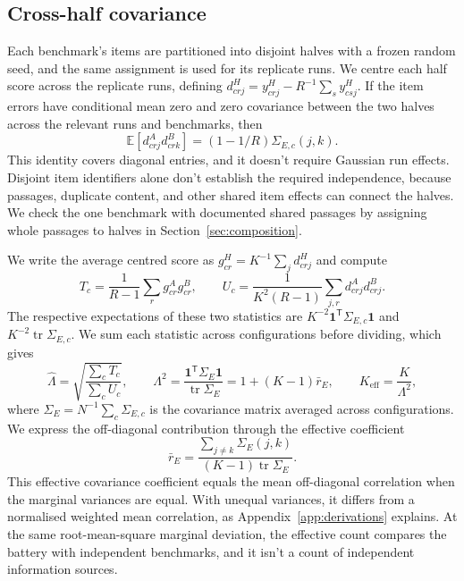 \documentclass{article}
\newcommand{\Lam}{\Lambda}
\newcommand{\Sig}{\Sigma_E}
\begin{document}
\subsection{Cross-half covariance}
Each benchmark's items are partitioned into disjoint halves with a frozen random seed, and the same assignment is used for its replicate runs. We centre each half score across the replicate runs, defining $d^H_{crj}=y^H_{crj}-R^{-1}\sum_s y^H_{csj}$. If the item errors have conditional mean zero and zero covariance between the two halves across the relevant runs and benchmarks, then
\begin{equation}
\mathbb{E}[d^A_{crj}d^B_{crk}]=(1-1/R)\Sigma_{E,c}(j,k).
\label{eq:identity}
\end{equation}
This identity covers diagonal entries, and it doesn't require Gaussian run effects. Disjoint item identifiers alone don't establish the required independence, because passages, duplicate content, and other shared item effects can connect the halves. We check the one benchmark with documented shared passages by assigning whole passages to halves in Section~\ref{sec:composition}.

We write the average centred score as $g^H_{cr}=K^{-1}\sum_j d^H_{crj}$ and compute
\begin{equation}
T_c=\frac{1}{R-1}\sum_r g^A_{cr}g^B_{cr},\qquad
U_c=\frac{1}{K^2(R-1)}\sum_{j,r}d^A_{crj}d^B_{crj}.
\label{eq:tu}
\end{equation}
The respective expectations of these two statistics are $K^{-2}\mathbf{1}^{\mathsf T}\Sigma_{E,c}\mathbf{1}$ and $K^{-2}\operatorname{tr}\Sigma_{E,c}$. We sum each statistic across configurations before dividing, which gives
\begin{equation}
\widehat\Lam=\sqrt{\frac{\sum_c T_c}{\sum_c U_c}},\qquad
\Lam^2=\frac{\mathbf{1}^{\mathsf T}\Sig\mathbf{1}}{\operatorname{tr}\Sig}
=1+(K-1)\bar r_E,\qquad K_{\mathrm{eff}}=\frac{K}{\Lam^2},
\label{eq:lambda}
\end{equation}
where $\Sig=N^{-1}\sum_c\Sigma_{E,c}$ is the covariance matrix averaged across configurations. We express the off-diagonal contribution through the effective coefficient
\begin{equation}
\bar r_E=\frac{\sum_{j\ne k}\Sigma_E(j,k)}{(K-1)\operatorname{tr}\Sig}.
\label{eq:effective}
\end{equation}
This effective covariance coefficient equals the mean off-diagonal correlation when the marginal variances are equal. With unequal variances, it differs from a normalised weighted mean correlation, as Appendix~\ref{app:derivations} explains. At the same root-mean-square marginal deviation, the effective count compares the battery with independent benchmarks, and it isn't a count of independent information sources.
\end{document}
